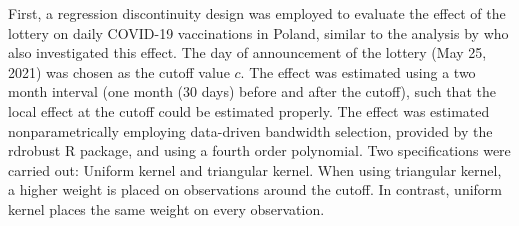 \documentclass{scrbook}
\begin{document}
First, a regression discontinuity design was employed to evaluate the
effect of the lottery on daily COVID-19 vaccinations in Poland, similar
to the analysis by \textcite{kuznetsova_effectiveness_2022} who also
investigated this effect. The day of announcement of the lottery (May
25, 2021) was chosen as the cutoff value \(c\). The effect was estimated
using a two month interval (one month (30 days) before and after the
cutoff), such that the local effect at the cutoff could be estimated
properly. The effect was estimated nonparametrically employing
data-driven bandwidth selection, provided by the rdrobust R package, and
using a fourth order polynomial. Two specifications were carried out:
Uniform kernel and triangular kernel. When using triangular kernel, a
higher weight is placed on observations around the cutoff. In contrast,
uniform kernel places the same weight on every observation.
\end{document}
